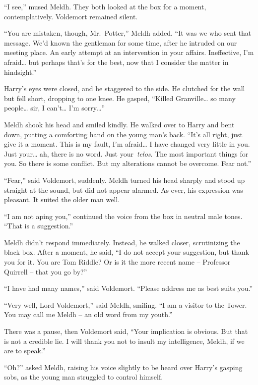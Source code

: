 ``I see,'' mused Meldh. They both looked at the box for a moment,
contemplatively. Voldemort remained silent.

``You are mistaken, though, Mr.~Potter,'' Meldh added. ``It was we who
sent that message. We'd known the gentleman for some time, after he
intruded on our meeting place. An early attempt at an intervention in
your affairs. Ineffective, I'm afraid\ldots{} but perhaps that's for the
best, now that I consider the matter in hindsight.''

Harry's eyes were closed, and he staggered to the side. He clutched for
the wall but fell short, dropping to one knee. He gasped, ``Killed
Granville\ldots{} so many people\ldots{} sir, I can't\ldots{} I'm
sorry\ldots{}''

Meldh shook his head and smiled kindly. He walked over to Harry and bent
down, putting a comforting hand on the young man's back. ``It's all
right, just give it a moment. This is my fault, I'm afraid\ldots{} I
have changed very little in you. Just your\ldots{} ah, there is no word.
Just your~\emph{telos}. The most important things for you. So there is
some conflict. But my alterations cannot be overcome. Fear not.''

``Fear,'' said Voldemort, suddenly. Meldh turned his head sharply and
stood up straight at the sound, but did not appear alarmed. As ever, his
expression was pleasant. It suited the older man well.

``I am not aping you,'' continued the voice from the box in neutral male
tones. ``That is a suggestion.''

Meldh didn't respond immediately. Instead, he walked closer,
scrutinizing the black box. After a moment, he said, ``I do not accept
your suggestion, but thank you for it. You are Tom Riddle? Or is it the
more recent name -- Professor Quirrell -- that you go by?''

``I have had many names,'' said Voldemort. ``Please address me as best
suits you.''

``Very well, Lord Voldemort,'' said Meldh, smiling. ``I am a visitor to
the Tower. You may call me Meldh -- an old word from my youth.''

There was a pause, then Voldemort said, ``Your implication is obvious.
But that is not a credible lie. I will thank you not to insult my
intelligence, Meldh, if we are to speak.''

``Oh?'' asked Meldh, raising his voice slightly to be heard over Harry's
gasping sobs, as the young man struggled to control himself.

